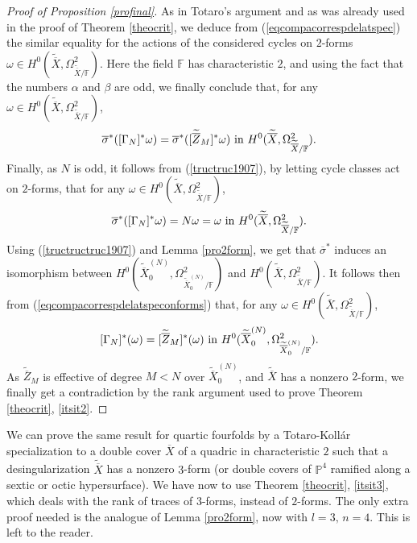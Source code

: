 \documentclass[10pt]{article}
\begin{document}
\begin{proof}[Proof of Proposition \ref{profinal}]
As in Totaro's argument and as was already used in the proof of Theorem \ref{theocrit}, we  deduce from (\ref{eqcompacorrespdelatspec}) the similar equality for the actions of the considered cycles on $2$-forms $\omega\in H^0(\widetilde{\overline{X}},\Omega^2_{\widetilde{\overline{X}}/\mathbb{F}})$. Here the field $\mathbb{F}$ has characteristic $2$, and using the fact that the numbers $\alpha $ and $\beta$ are odd, we finally conclude that, for any $\omega\in H^0(\widetilde{\overline{X}},\Omega^2_{\widetilde{\overline{X}}/\mathbb{F}})$,
\begin{eqnarray}\label{eqcompacorrespdelatspeconforms}  \overline{\sigma}^*( [\Gamma_N]^*\omega)=  \overline{\sigma}^*([\widetilde{\overline{Z}}_M]^*\omega)  \,\,{\rm in}\,\,H^0(\widetilde{\overline{X}},\Omega^2_{\widetilde{\overline{X}}/\mathbb{F}}).
\end{eqnarray}
Finally, as $N$ is odd, it follows from (\ref{tructruc1907}), by letting cycle classes  act on  $2$-forms, that for any $\omega\in H^0(\widetilde{\overline{X}},\Omega_{\widetilde{\overline{X}}/\mathbb{F}}^2)$,
\begin{eqnarray} \label{tructructruc1907} \overline{\sigma}^*([\Gamma_N]^*\omega)=N\omega=\omega\,\,{\rm in}\,\,H^0(\widetilde{\overline{X}},\Omega_{\widetilde{\overline{X}}/\mathbb{F}}^2).
\end{eqnarray}
Using (\ref{tructructruc1907})  and Lemma \ref{pro2form}, we get  that  $\overline{\sigma}^* $ induces an isomorphism between
$H^0( \widetilde{\overline{X}}^{(N)}_0, \Omega^2_{\widetilde{\overline{X}}^{(N)}_0/\mathbb{F}})$ and $H^0(\widetilde{\overline{X}},\Omega^2_{\widetilde{\overline{X}}/\mathbb{F}})$. It follows then from (\ref{eqcompacorrespdelatspeconforms}) that, for any $\omega\in H^0(\widetilde{\overline{X}},\Omega^2_{\widetilde{\overline{X}}/\mathbb{F}})$,
\begin{eqnarray}\label{eqcompacorrespdelatspeconformssurxN}   [\Gamma_N]^*(\omega)=  [\widetilde{\overline{Z}}_M]^*(\omega)  \,\,{\rm in}\,\,H^0(\widetilde{\overline{X}}^{(N)}_0,\Omega^2_{\widetilde{\overline{X}}^{(N)}_0/\mathbb{F}}).
\end{eqnarray}
As $\widetilde{\overline{Z}}_M$ is effective of degree $M<N$ over $\widetilde{\overline{X}}^{(N)}_0$, and $\widetilde{\overline{X}}$ has a nonzero $2$-form, we finally get a contradiction by the   rank argument used to prove Theorem \ref{theocrit}, \ref{itsit2}. \end{proof}

 We can prove the same result for quartic fourfolds by a Totaro-Koll\'ar specialization to a double cover $\overline{X}$ of a quadric in characteristic $2$ such that a desingularization $\widetilde{\overline{X}}$  has a nonzero $3$-form (or double covers of $\mathbb{P}^4$ ramified along a sextic or octic hypersurface). We have now to use  Theorem \ref{theocrit}, \ref{itsit3}, which deals with the rank of traces of $3$-forms, instead of $2$-forms. The only extra proof needed is the analogue of Lemma \ref{pro2form}, now with $l=3,\,n=4$.  This is left to the reader.
\end{document}
